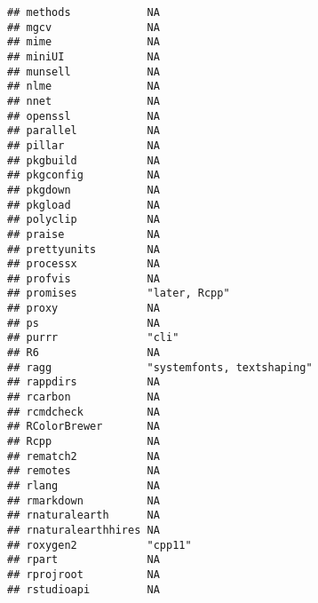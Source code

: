 \documentclass[
]{article}
\begin{document}
\begin{verbatim}
## methods            NA                                        
## mgcv               NA                                        
## mime               NA                                        
## miniUI             NA                                        
## munsell            NA                                        
## nlme               NA                                        
## nnet               NA                                        
## openssl            NA                                        
## parallel           NA                                        
## pillar             NA                                        
## pkgbuild           NA                                        
## pkgconfig          NA                                        
## pkgdown            NA                                        
## pkgload            NA                                        
## polyclip           NA                                        
## praise             NA                                        
## prettyunits        NA                                        
## processx           NA                                        
## profvis            NA                                        
## promises           "later, Rcpp"                             
## proxy              NA                                        
## ps                 NA                                        
## purrr              "cli"                                     
## R6                 NA                                        
## ragg               "systemfonts, textshaping"                
## rappdirs           NA                                        
## rcarbon            NA                                        
## rcmdcheck          NA                                        
## RColorBrewer       NA                                        
## Rcpp               NA                                        
## rematch2           NA                                        
## remotes            NA                                        
## rlang              NA                                        
## rmarkdown          NA                                        
## rnaturalearth      NA                                        
## rnaturalearthhires NA                                        
## roxygen2           "cpp11"                                   
## rpart              NA                                        
## rprojroot          NA                                        
## rstudioapi         NA                                        

\end{verbatim}
\end{document}
